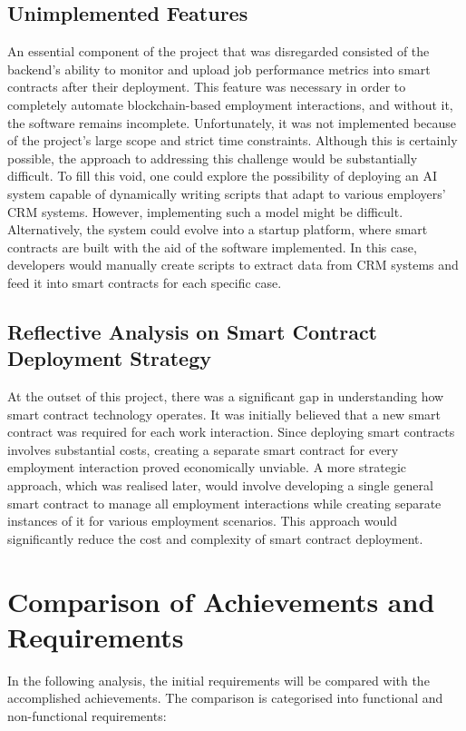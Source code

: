 \subsection{Unimplemented Features}

An essential component of the project that was disregarded consisted of the backend's ability to monitor and upload job performance metrics into smart contracts after their deployment. This feature was necessary in order to completely automate blockchain-based employment interactions, and without it, the software remains incomplete. Unfortunately, it was not implemented because of the project's large scope and strict time constraints. Although this is certainly possible, the approach to addressing this challenge would be substantially difficult. To fill this void, one could explore the possibility of deploying an AI system capable of dynamically writing scripts that adapt to various employers' CRM systems. However, implementing such a model might be difficult. Alternatively, the system could evolve into a startup platform, where smart contracts are built with the aid of the software implemented. In this case, developers would manually create scripts to extract data from CRM systems and feed it into smart contracts for each specific case.  

\subsection{Reflective Analysis on Smart Contract Deployment Strategy}

At the outset of this project, there was a significant gap in understanding how smart contract technology operates. It was initially believed that a new smart contract was required for each work interaction. Since deploying smart contracts involves substantial costs, creating a separate smart contract for every employment interaction proved economically unviable. A more strategic approach, which was realised later, would involve developing a single general smart contract to manage all employment interactions while creating separate instances of it for various employment scenarios. This approach would significantly reduce the cost and complexity of smart contract deployment.

\section{Comparison of Achievements and Requirements}

In the following analysis, the initial requirements will be compared with the accomplished achievements. The comparison is categorised into functional and non-functional requirements:

